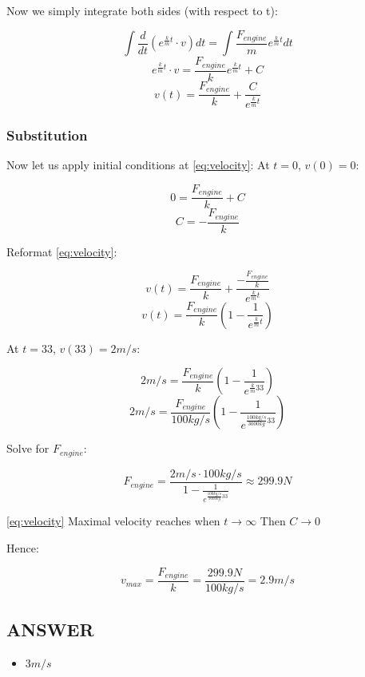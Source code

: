 \bigbreak Now we simply integrate both sides (with respect to t):

$$ \int\frac{d}{dt}(e^{\frac{k}{m}t} \cdot v) dt = \int \frac{F_{engine}}{m} e^{\frac{k}{m}t} dt $$
$$ e^{\frac{k}{m}t} \cdot v = \frac{F_{engine}}{k} e^{\frac{k}{m}t} + C $$
\begin{equation}
    \label{eq:velocity}
    v(t) = \frac{F_{engine}}{k} + \frac{C}{e^{\frac{k}{m}t}}
\end{equation}

\subsubsection*{Substitution}

\bigbreak Now let us apply initial conditions at \ref{eq:velocity}:
\bigbreak At $t = 0$, $v(0) = 0$:

$$ 0 = \frac{F_{engine}}{k} + C $$
$$ C = - \frac{F_{engine}}{k} $$

Reformat \ref{eq:velocity}:

$$ v(t) = \frac{F_{engine}}{k} + \frac{- \frac{F_{engine}}{k}}{e^{\frac{k}{m}t}} $$
$$ v(t) = \frac{F_{engine}}{k} (1 -  \frac{1}{e^{\frac{k}{m}t}}) $$

\bigbreak At $t = 33$, $v(33) = 2m/s$:

$$ 2m/s = \frac{F_{engine}}{k} (1 -  \frac{1}{e^{\frac{k}{m}33}}) $$
$$ 2m/s = \frac{F_{engine}}{100kg/s} (1 -  \frac{1}{e^{\frac{100kg/s}{3000kg}33}}) $$

Solve for $F_{engine}$:

$$ F_{engine} = \frac{2m/s \cdot 100kg/s}{1 -  \frac{1}{e^{\frac{100kg/s}{3000kg}33}}} \approx 299.9N$$

\bigbreak \ref{eq:velocity} Maximal velocity reaches when $ t \rightarrow \infty $
\smallbreak Then $ C \rightarrow 0 $

\bigbreak Hence:

$$ v_{max} = \frac{F_{engine}}{k} = \frac{299.9N}{100kg/s} = \boxed{2.9m/s} $$

\vfill \subsection*{ANSWER}
\begin{itemize}
    \item $3m/s$
\end{itemize}